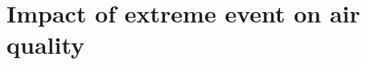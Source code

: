 \chapter{Impact of extreme event on air quality}
\renewcommand{\headrulewidth}{0pt}
\lhead[\thepage]{\rightmark}
\rhead[\rightmark]{\thepage}
\cfoot[]{}


